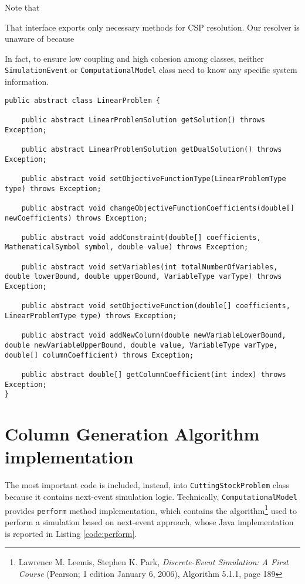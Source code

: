 \documentclass[10pt,a4paper]{article}
\begin{document}
Note that 

That interface exports only necessary methods for CSP resolution. Our resolver is unaware of because 





In fact, to ensure low coupling and high cohesion among classes, neither \texttt{SimulationEvent} or \texttt{ComputationalModel} class need to know any specific system information. 



\begin{lstlisting}[frame=lines, caption={\texttt{LinearProblem} interface implementation.}, label={code:LinearProblem}]
public abstract class LinearProblem {

    public abstract LinearProblemSolution getSolution() throws Exception;
    
	public abstract LinearProblemSolution getDualSolution() throws Exception;

    public abstract void setObjectiveFunctionType(LinearProblemType type) throws Exception;

    public abstract void changeObjectiveFunctionCoefficients(double[] newCoefficients) throws Exception;

    public abstract void addConstraint(double[] coefficients, MathematicalSymbol symbol, double value) throws Exception;

    public abstract void setVariables(int totalNumberOfVariables, double lowerBound, double upperBound, VariableType varType) throws Exception;

    public abstract void setObjectiveFunction(double[] coefficients, LinearProblemType type) throws Exception;

    public abstract void addNewColumn(double newVariableLowerBound, double newVariableUpperBound, double value, VariableType varType, double[] columnCoefficient) throws Exception;

    public abstract double[] getColumnCoefficient(int index) throws Exception;
}
\end{lstlisting}

\section{Column Generation Algorithm implementation}

The most important code is included, instead, into \texttt{CuttingStockProblem} class because it contains next-event simulation logic. Technically, \texttt{ComputationalModel} provides \texttt{perform} method implementation, which contains the algorithm\footnote{Lawrence M. Leemis, Stephen K. Park, \textit{Discrete-Event Simulation: A First Course} (Pearson; 1 edition January 6, 2006), Algorithm 5.1.1, page 189} used to perform a simulation based on next-event approach, whose Java implementation is reported in Listing \ref{code:perform}. 
\end{document}
